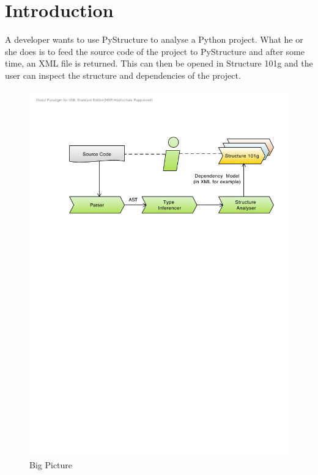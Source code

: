 \documentclass[12pt,halfparskip,DIV11,BCOR10mm]{scrreprt}
\begin{document}
\newpage

\tableofcontents

\newpage
{}
\pagestyle{scrheadings}

\chapter{Introduction}


A developer wants to use PyStructure to analyse a Python project. What he or she does is to feed the source code of the project to PyStructure and after some time, an XML file is returned. This can then be opened in Structure 101g and the user can inspect the structure and dependencies of the project.

\begin{figure}[H]
    \centering
    \includegraphics[width=\textwidth]{project/big_picture}
    \caption{Big Picture}
    \label{fig:big_picture}
\end{figure}
\end{document}
